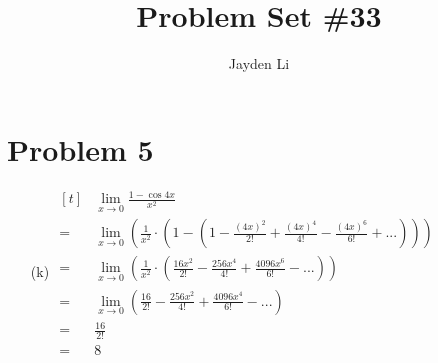 \documentclass{article}
\title{Problem Set \#33}
\author{Jayden Li}
\begin{document}
\maketitle

\fontsize{12pt}{12pt}\selectfont

\section*{Problem 5}

\begin{itemize}

\item[(k)] 
$\begin{aligned}[t]
	&\lim\limits_{x\to0}\frac{1-\cos4x}{x^2} \\
	=&\lim\limits_{x\to0}\left(\frac{1}{x^2}\cdot\left(1-\left(
		1
		-\frac{\left(4x\right)^2}{2!}
		+\frac{\left(4x\right)^4}{4!}
		-\frac{\left(4x\right)^6}{6!}
		+...
	\right)\right)\right) \\
	=&\lim\limits_{x\to0}\left(\frac{1}{x^2}\cdot\left(
		\frac{16x^2}{2!}
		-\frac{256x^4}{4!}
		+\frac{4096x^6}{6!}
		-...
	\right)\right) \\
	=&\lim\limits_{x\to0}\left(
		\frac{16}{2!}
		-\frac{256x^2}{4!}
		+\frac{4096x^4}{6!}
		-...
	\right) \\
	=&\frac{16}{2!} \\
	=&\boxed{8}
\end{aligned}$

\end{itemize}
\end{document}
